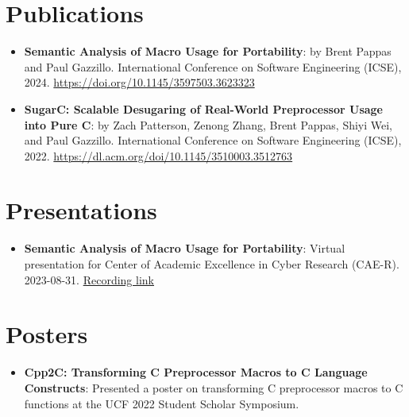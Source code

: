 \documentclass[a4paper,20pt]{article}
\newcommand{\resumeItem}[2]{
  \item\small{
    \textbf{#1}{: #2 \vspace{-2pt}}
  }
}
\newcommand{\resumeSubItem}[2]{\resumeItem{#1}{#2}\vspace{-3pt}}
\newcommand{\resumeSubHeadingListStart}{\begin{itemize}[leftmargin=*, label={}]}
\newcommand{\resumeSubHeadingListEnd}{\end{itemize}}
\begin{document}
\vspace{-5pt}
\section{Publications}
\resumeSubHeadingListStart

\resumeSubItem
{Semantic Analysis of Macro Usage for Portability}
{by Brent Pappas and Paul Gazzillo. International Conference on Software Engineering (ICSE), 2024. \url{https://doi.org/10.1145/3597503.3623323}}

\resumeSubItem
{SugarC: Scalable Desugaring of Real-World Preprocessor Usage into Pure C}
{by Zach Patterson, Zenong Zhang, Brent Pappas, Shiyi Wei, and Paul Gazzillo. International Conference on Software Engineering (ICSE), 2022. \url{https://dl.acm.org/doi/10.1145/3510003.3512763}}
\resumeSubHeadingListEnd

\vspace{-5pt}
\section{Presentations}
\resumeSubHeadingListStart
\resumeSubItem
{Semantic Analysis of Macro Usage for Portability}
{Virtual presentation for Center of Academic Excellence in Cyber Research (CAE-R). 2023-08-31. \href{https://drive.google.com/file/d/1xCd34w54hs1iyaoXHz0MUkwlH-fP3HLo/view} {Recording link}}
\resumeSubHeadingListEnd

\vspace{-5pt}
\section{Posters}
\resumeSubHeadingListStart
\resumeSubItem
{Cpp2C: Transforming C Preprocessor Macros to C Language Constructs}
{Presented a poster on transforming C preprocessor macros to C functions at the UCF 2022 Student Scholar Symposium.}
\resumeSubHeadingListEnd

\vspace{-5pt}
\end{document}
